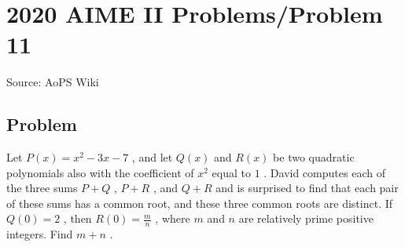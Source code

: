 \documentclass[12pt]{article}
\begin{document}
\section*{{2020 AIME II Problems/Problem 11}}
Source: AoPS Wiki

\subsection*{Problem}
Let $P(x) = x^2 - 3x - 7$ , and let $Q(x)$ and $R(x)$ be two quadratic polynomials also with the coefficient of $x^2$ equal to $1$ . David computes each of the three sums $P + Q$ , $P + R$ , and $Q + R$ and is surprised to find that each pair of these sums has a common root, and these three common roots are distinct. If $Q(0) = 2$ , then $R(0) = \frac{m}{n}$ , where $m$ and $n$ are relatively prime positive integers. Find $m + n$ .
\end{document}
